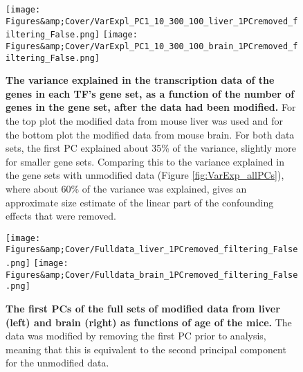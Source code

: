 \begin{figure}
    \centering
    \texttt{[image: Figures\&amp;Cover/VarExpl\_PC1\_10\_300\_100\_liver\_1PCremoved\_filtering\_False.png]}
    \texttt{[image: Figures\&amp;Cover/VarExpl\_PC1\_10\_300\_100\_brain\_1PCremoved\_filtering\_False.png]}
    \caption{\textbf{The variance explained in the transcription data of the genes in each \ac{TF}'s gene set, as a function of the number of genes in the gene set, after the data had been modified.} For the top plot the modified data from mouse liver was used and for the bottom plot the modified data from mouse brain. For both data sets, the first \ac{PC} explained about 35\% of the variance, slightly more for smaller gene sets. Comparing this to the variance explained in the gene sets with unmodified data (Figure \ref{fig:VarExp_allPCs}), where about 60\% of the variance was explained, gives an approximate size estimate of the linear part of the confounding effects that were removed.}
    \label{fig:VarExp_1PCsRemoved}
\end{figure}

\begin{figure}
    \centering
    \texttt{[image: Figures\&amp;Cover/Fulldata\_liver\_1PCremoved\_filtering\_False.png]}
    \texttt{[image: Figures\&amp;Cover/Fulldata\_brain\_1PCremoved\_filtering\_False.png]}
    \caption{\textbf{The first \acp{PC} of the full sets of modified data from liver (left) and brain (right) as functions of age of the mice.} The data was modified by removing the first \ac{PC} prior to analysis, meaning that this is equivalent to the second principal component for the unmodified data.}
    \label{fig:firstPCremoved}
\end{figure}




